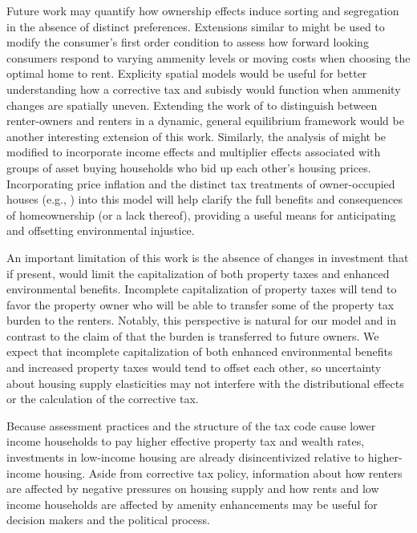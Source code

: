 \documentclass[ecta,nameyear,draft]{econsocart}
\theoremstyle{plain}
\theoremstyle{remark}
\begin{document}
Future work may quantify how ownership effects induce sorting and segregation in the absence of distinct preferences. Extensions similar to \cite{bishop19} might be used to modify the consumer's first order condition to assess how forward looking consumers respond to varying ammenity levels or moving costs when choosing the optimal home to rent. Explicity spatial models would be useful for better understanding how a corrective tax and subisdy would function when ammenity changes are spatially uneven. Extending the work of \cite{kanemoto88} to distinguish between renter-owners and renters in a dynamic, general equilibrium framework would be another interesting extension of this work. Similarly, the analysis of \cite{gervais2002} might be modified to incorporate income effects and multiplier effects associated with groups of asset buying households who bid up each other's housing prices. Incorporating price inflation and the distinct tax treatments of owner-occupied  houses (e.g., \cite{poterba84}) into this model will help clarify the full benefits and consequences of homeownership (or a lack thereof), providing a useful means for anticipating and offsetting environmental injustice.

An important limitation of this work is the absence of changes in investment that if present, would limit the capitalization of both property taxes and enhanced environmental benefits. Incomplete capitalization of property taxes will tend to favor the property owner who will be able to transfer some of the property tax burden to the renters. Notably, this perspective is natural for our model and in contrast to the claim of \cite{sirmans08} that the burden is transferred to future owners. We expect that incomplete capitalization of both enhanced environmental benefits and increased property taxes would tend to offset each other, so uncertainty about housing supply elasticities may not interfere with the distributional effects or the calculation of the corrective tax. 

Because assessment practices and the structure of the tax code cause lower income households to pay higher effective property tax and wealth rates, investments in low-income housing are already disincentivized relative to higher-income housing. Aside from corrective tax policy, information about how renters are affected by negative pressures on housing supply and how rents and low income households are affected by amenity enhancements may be useful for decision makers and the political process.
\end{document}
